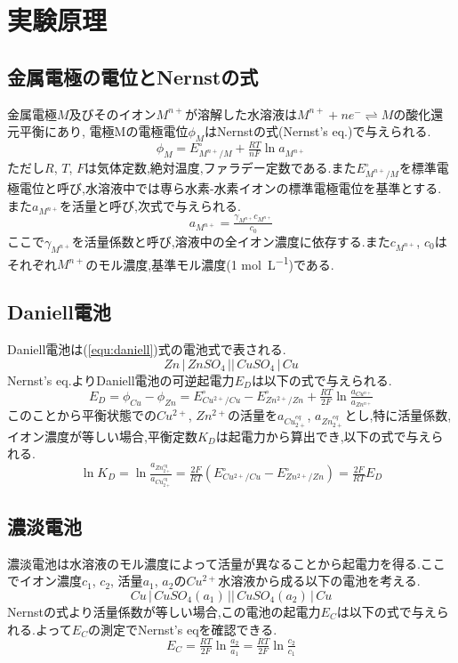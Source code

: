 \section{実験原理}
\subsection{金属電極の電位とNernstの式}
金属電極$M$及びそのイオン$M^{n+}$が溶解した水溶液は$M^{n+}+ne^{-} \rightleftharpoons M$の酸化還元平衡にあり,
電極Mの電極電位$\phi_M$はNernstの式(Nernst's eq.)で与えられる.
\begin{equation}
  \label{equ:nernst}
  \phi_M = E^{\circ}_{M^{n+}/M} + \tfrac{RT}{nF} \ln a_{M^{n+}}
\end{equation}
ただし$R$, $T$, $F$は気体定数,絶対温度,ファラデー定数である.また$E^{\circ}_{M^{n+}/M}$を標準電極電位と呼び,水溶液中では専ら水素-水素イオンの標準電極電位を基準とする.
また$a_{M^{n+}}$を活量と呼び,次式で与えられる.
\begin{equation}
  \label{equ:katuryo}
  a_{M^{n+}}=\tfrac{\gamma_{M^{n+}}c_{M^{n+}}}{c_0}
\end{equation}
ここで$\gamma_{M^{n+}}$を活量係数と呼び,溶液中の全イオン濃度に依存する.また$c_{M^{n+}}$, $c_0$はそれぞれ$M^{n+}$のモル濃度,基準モル濃度(1 \si{\mole.L^{-1}})である.
\subsection{Daniell電池}
Daniell電池は(\ref{equ:daniell})式の電池式で表される.
\begin{equation}
  \label{equ:daniell}
  Zn\,|\,ZnSO_4\,||\,CuSO_4\,|\,Cu
\end{equation}
Nernst's eq.よりDaniell電池の可逆起電力$E_D$は以下の式で与えられる.
\begin{equation}
  \label{equ:ED}
  E_D=\phi_{Cu} - \phi_{Zn}=E^{\circ}_{Cu^{2+}/Cu}-E^{\circ}_{Zn^{2+}/Zn}+\tfrac{RT}{2F} \ln \tfrac{a_{Cu^{n+}}}{a_{Zn^{n+}}}
\end{equation}
このことから平衡状態での$Cu^{2+}$, $Zn^{2+}$の活量を$a_{Cu_{2+}^{eq}}$, $a_{Zn_{2+}^{eq}}$とし,特に活量係数,イオン濃度が等しい場合,平衡定数$K_D$は起電力から算出でき,以下の式で与えられる.
\begin{equation}
  \label{equ:K_D}
  \ln K_D=\ln \tfrac{a_{Zn_{2+}^{eq}}}{a_{Cu_{2+}^{eq}}}=\tfrac{2F}{RT} (E^{\circ}_{Cu^{2+}/Cu} - E^{\circ}_{Zn^{2+}/Zn})=\tfrac{2F}{RT} E_D
\end{equation}
\subsection{濃淡電池}
濃淡電池は水溶液のモル濃度によって活量が異なることから起電力を得る.ここでイオン濃度$c_1$, $c_2$, 活量$a_1$, $a_2$の$Cu^{2+}$水溶液から成る以下の電池を考える.
\begin{equation}
  \label{equ:noutandenti}
  Cu\,|\,CuSO_4(a_1)\,||\,CuSO_4(a_2)\,|\,Cu
\end{equation}
Nernstの式より活量係数が等しい場合,この電池の起電力$E_C$は以下の式で与えられる.よって$E_C$の測定でNernst's eqを確認できる.
\begin{equation}
  \label{equ:noutan}
  E_C=\tfrac{RT}{2F} \ln \tfrac{a_2}{a_1} = \tfrac{RT}{2F} \ln \tfrac{c_2}{c_1}
\end{equation}